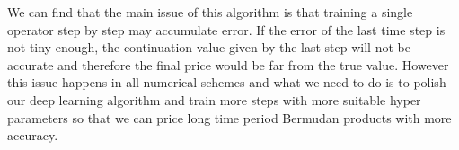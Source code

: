 \documentclass[11pt,a4paper]{article}
\theoremstyle{remark}
\begin{document}
	We can find that the main issue of this algorithm is that training a single operator step by step may accumulate error. If the error of the last time step is not tiny enough, the continuation value given by the last step will not be accurate and therefore the final price would be far from the true value. However this issue happens in all numerical schemes and what we need to do is to polish our deep learning algorithm and train more steps with more suitable hyper parameters so that we can price long time period Bermudan products with more accuracy.
	
	
	
	
	
	
	
	
	
	
	
	
	
	
	
	
	
	
	
	
	
	
	
	
	
	
	\iffalse
	
	
\end{document}

